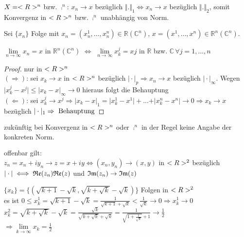 \begin{example}
	$X=<R>^n$ bzw. $\comp^n$: $x_n\to x$ bezüglich $\Vert .\Vert_1\iff x_n\to x$ bezüglich $\Vert .\Vert_2$, somit Konvergenz in $<R>^n$ bzw. $\comp^n$ unabhängig von Norm.
\end{example}

\begin{proposition}
	Sei $\{x_n\}$ Folge mit $x_n = (x_n^1, \dotsc, x_n^n)\in\mathbb{R} (\mathbb{C}^n)$, $x=(x^1, \dotsc,x^n)\in\mathbb{R}^n (\mathbb{C}^n)$.
	
	$\lim\limits_{n\rightarrow\infty} x_n = x$ in $\mathbb{R}^n (\mathbb{C}^n)$ $\Leftrightarrow$ $\lim\limits_{n\rightarrow\infty} x_k^j = xj$ in $\mathbb{R}$ bzw. $\mathbb{C}\,\forall j=1,\dotsc,n$
\end{proposition}
\begin{proof}
	nur in $<R>^n$ \\
	$(\Rightarrow)$: sei $x_k\to x$ in $<R>^n$ bezüglich $\vert\cdot\vert_p\Rightarrow x_n\to x$ bezüglich $\vert\cdot\vert_\infty$. Wegen $\vert x_k^j-x^j\vert\le \vert x_k-x\vert_\infty\to 0$ hieraus folgt die Behauptung \\
	$(\Leftarrow)$: sei $x_k^j\to x^j\Rightarrow\vert x_k-x\vert_1=\vert x_k^1-x^1\vert +...+\vert x_k^n-x^n\vert\to 0\Rightarrow x_k\to x$ bezüglich $\vert\cdot\vert_1\Rightarrow \text{ Behauptung}$
\end{proof}

\begin{underlinedenvironment}[Hinweis]
	zukünftig bei Konvergenz in $<R>^n$ oder $\comp^n$ in der Regel keine Angabe der konkreten Norm.
\end{underlinedenvironment}

\begin{remark}
	offenbar gilt: \\
	$z_n=x_n+iy_n\to z=x+iy\iff (x_n,y_n)\to (x,y)$ in $<R>^2$ bezüglich $\vert\cdot\vert\iff \mathfrak{Re}(z_n)\mathfrak{Re}(z)$ und $\mathfrak{Im}(z_n)\to\mathfrak{Im}(z)$
\end{remark}

\begin{example}
	$\{x_k\}=\{(\sqrt{k+1}-\sqrt{k},\sqrt{k+\sqrt{k}}-\sqrt{k})\}$ Folgen in $<R>^2$ \\
	es ist $0\le x_k^1=\sqrt{k+1}-\sqrt{k}=\frac{1}{\sqrt{k+1}+\sqrt{k}}<\frac{1}{\sqrt{k}}\to 0\Rightarrow x_k^1\to 0$ \\
	$x_k^2=\sqrt{k+\sqrt{k}}-\sqrt{k}=\frac{\sqrt{k}}{\sqrt{k+\sqrt{k}}+\sqrt{k}}=\frac{1}{\sqrt{1+\frac{1}{\sqrt{k}}}+1}\to \frac{1}{2}$ \\
	$\Rightarrow \lim\limits_{k\to\infty} x_k=\frac{1}{2}$
\end{example}


